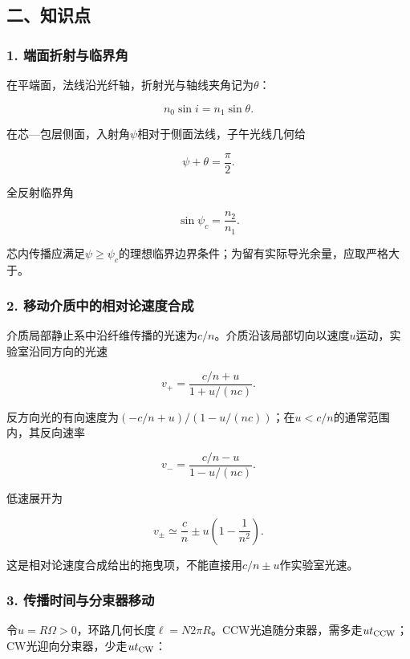 \documentclass[12pt,a4paper,fontset=fandol]{ctexart}
\begin{document}
\subsection{二、知识点}\label{ux4e8cux77e5ux8bc6ux70b9-5}

\subsubsection{1.
端面折射与临界角}\label{ux7aefux9762ux6298ux5c04ux4e0eux4e34ux754cux89d2}

在平端面，法线沿光纤轴，折射光与轴线夹角记为\(\theta\)：

\[
n_0\sin i=n_1\sin\theta.
\]

在芯---包层侧面，入射角\(\psi\)相对于侧面法线，子午光线几何给

\[
\psi+\theta=\frac\pi2.
\]

全反射临界角

\[
\sin\psi_c=\frac{n_2}{n_1}.
\]

芯内传播应满足\(\psi\geq\psi_c\)的理想临界边界条件；为留有实际导光余量，应取严格大于。

\subsubsection{2.
移动介质中的相对论速度合成}\label{ux79fbux52a8ux4ecbux8d28ux4e2dux7684ux76f8ux5bf9ux8bbaux901fux5ea6ux5408ux6210}

介质局部静止系中沿纤维传播的光速为\(c/n\)。介质沿该局部切向以速度\(u\)运动，实验室沿同方向的光速

\[
v_+=\frac{c/n+u}{1+u/(nc)}.
\]

反方向光的有向速度为\((-c/n+u)/(1-u/(nc))\)；在\(u<c/n\)的通常范围内，其反向速率

\[
v_-=\frac{c/n-u}{1-u/(nc)}.
\]

低速展开为

\[
v_\pm\simeq\frac cn
\pm u\left(1-\frac1{n^2}\right).
\]

这是相对论速度合成给出的拖曳项，不能直接用\(c/n\pm u\)作实验室光速。

\subsubsection{3.
传播时间与分束器移动}\label{ux4f20ux64adux65f6ux95f4ux4e0eux5206ux675fux5668ux79fbux52a8}

令\(u=R\Omega>0\)，环路几何长度\(\ell=N2\pi R\)。CCW光追随分束器，需多走\(ut_{\rm CCW}\)；CW光迎向分束器，少走\(ut_{\rm CW}\)：
\end{document}
